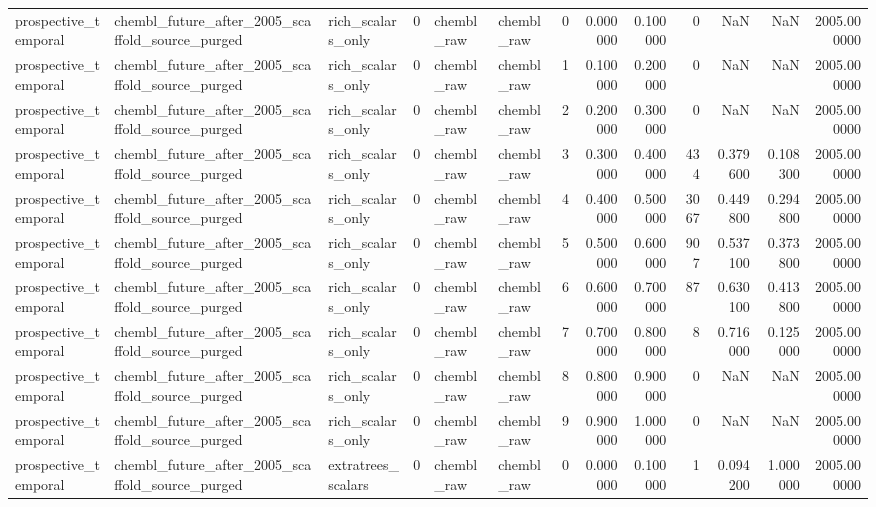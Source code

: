 \begin{longtable}{lllrllrrrrrrr}
prospective\_temporal & chembl\_future\_after\_2005\_scaffold\_source\_purged & rich\_scalars\_only & 0 & chembl\_raw & chembl\_raw & 0 & 0.000000 & 0.100000 & 0 & NaN & NaN & 2005.000000 \\
prospective\_temporal & chembl\_future\_after\_2005\_scaffold\_source\_purged & rich\_scalars\_only & 0 & chembl\_raw & chembl\_raw & 1 & 0.100000 & 0.200000 & 0 & NaN & NaN & 2005.000000 \\
prospective\_temporal & chembl\_future\_after\_2005\_scaffold\_source\_purged & rich\_scalars\_only & 0 & chembl\_raw & chembl\_raw & 2 & 0.200000 & 0.300000 & 0 & NaN & NaN & 2005.000000 \\
prospective\_temporal & chembl\_future\_after\_2005\_scaffold\_source\_purged & rich\_scalars\_only & 0 & chembl\_raw & chembl\_raw & 3 & 0.300000 & 0.400000 & 434 & 0.379600 & 0.108300 & 2005.000000 \\
prospective\_temporal & chembl\_future\_after\_2005\_scaffold\_source\_purged & rich\_scalars\_only & 0 & chembl\_raw & chembl\_raw & 4 & 0.400000 & 0.500000 & 3067 & 0.449800 & 0.294800 & 2005.000000 \\
prospective\_temporal & chembl\_future\_after\_2005\_scaffold\_source\_purged & rich\_scalars\_only & 0 & chembl\_raw & chembl\_raw & 5 & 0.500000 & 0.600000 & 907 & 0.537100 & 0.373800 & 2005.000000 \\
prospective\_temporal & chembl\_future\_after\_2005\_scaffold\_source\_purged & rich\_scalars\_only & 0 & chembl\_raw & chembl\_raw & 6 & 0.600000 & 0.700000 & 87 & 0.630100 & 0.413800 & 2005.000000 \\
prospective\_temporal & chembl\_future\_after\_2005\_scaffold\_source\_purged & rich\_scalars\_only & 0 & chembl\_raw & chembl\_raw & 7 & 0.700000 & 0.800000 & 8 & 0.716000 & 0.125000 & 2005.000000 \\
prospective\_temporal & chembl\_future\_after\_2005\_scaffold\_source\_purged & rich\_scalars\_only & 0 & chembl\_raw & chembl\_raw & 8 & 0.800000 & 0.900000 & 0 & NaN & NaN & 2005.000000 \\
prospective\_temporal & chembl\_future\_after\_2005\_scaffold\_source\_purged & rich\_scalars\_only & 0 & chembl\_raw & chembl\_raw & 9 & 0.900000 & 1.000000 & 0 & NaN & NaN & 2005.000000 \\
prospective\_temporal & chembl\_future\_after\_2005\_scaffold\_source\_purged & extratrees\_scalars & 0 & chembl\_raw & chembl\_raw & 0 & 0.000000 & 0.100000 & 1 & 0.094200 & 1.000000 & 2005.000000 \\

\end{longtable}
